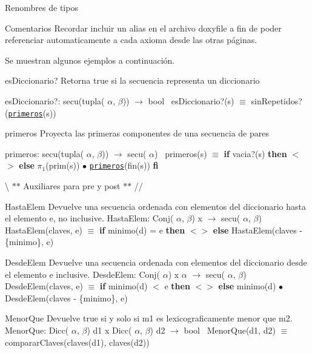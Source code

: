 \begin{DoxyParagraph}{\-Renombres de tipos}
\begin{DoxyRemark}{Comentarios}
Recordar incluir un alias en el archivo doxyfile a fin de poder referenciar automaticamente a cada axioma desde las otras páginas.
\end{DoxyRemark}
Se muestran algunos ejemplos a continuación.

\begin{DoxyParagraph}{es\+Diccionario?}
Retorna true si la secuencia representa un diccionario

es\+Diccionario?\+: secu(tupla( $\alpha$, $\beta$)) $\to$ bool~\newline
 es\+Diccionario?(s) $\equiv$ sin\+Repetidos?(\href{axiomas.html#primeros}{\tt primeros}(s)) 
\end{DoxyParagraph}


\begin{DoxyParagraph}{primeros}
Proyecta las primeras componentes de una secuencia de pares

primeros\+: secu(tupla( $\alpha$, $\beta$)) $\to$ secu( $\alpha$)~\newline
 primeros(s) $\equiv$ {\bfseries if} vacia?(s) {\bfseries then} $<$$>$ {\bfseries else} $\pi_1$(prim(s)) $\bullet$ \href{axiomas.html#primeros}{\tt primeros}(fin(s)) {\bfseries fi} 
\end{DoxyParagraph}


\textbackslash{} $\ast$$\ast$ Auxiliares para pre y post $\ast$$\ast$ // \begin{DoxyParagraph}{Hasta\+Elem}
Devuelve una secuencia ordenada con elementos del diccionario hasta el elemento e, no inclusive. Hasta\+Elem\+: Conj( $\alpha$, $\beta$) x $\to$ secu( $\alpha$, $\beta$)~\newline
 Hasta\+Elem(claves, e) $\equiv$ {\bfseries if} minimo(d) = e {\bfseries then} $<$$>$ {\bfseries else} Hasta\+Elem(claves -\/ \{minimo\}, e) 
\end{DoxyParagraph}


\begin{DoxyParagraph}{Desde\+Elem}
Devuelve una secuencia ordenada con elementos del diccionario desde el elemento e inclusive. Desde\+Elem\+: Conj( $\alpha$) x $\alpha$ $\to$ secu( $\alpha$, $\beta$)~\newline
 Desde\+Elem(claves, e) $\equiv$ {\bfseries if} minimo(d) $<$ e {\bfseries then} $<$$>$ {\bfseries else} minimo(d) $\bullet$ Desde\+Elem(claves -\/ \{minimo\}, e) 
\end{DoxyParagraph}


\begin{DoxyParagraph}{Menor\+Que}
Devuelve true si y solo si m1 es lexicograficamente menor que m2. Menor\+Que\+: Dicc( $\alpha$, $\beta$) d1 x Dicc( $\alpha$, $\beta$) d2 $\to$ bool~\newline
 Menor\+Que(d1, d2) $\equiv$ comparar\+Claves(claves(d1), claves(d2)) 
\end{DoxyParagraph}



\end{DoxyParagraph}
